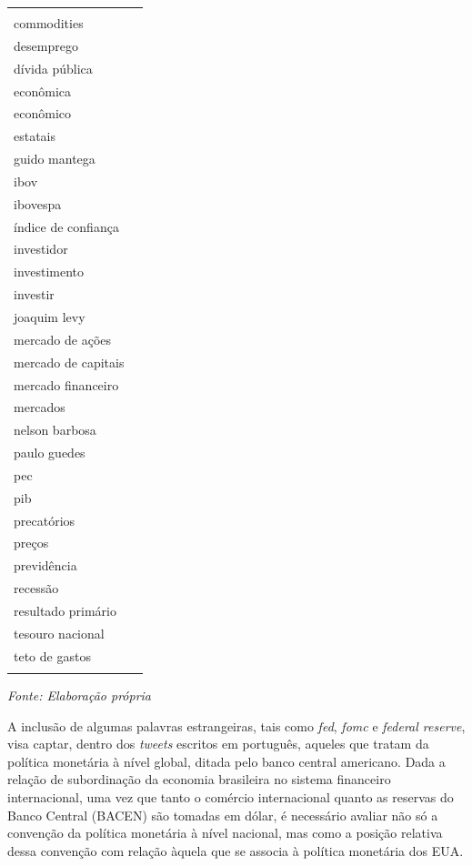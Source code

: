 \begin{minipage}{\textwidth}
\begin{tabularx}{0.7\textwidth}{ %
>{\raggedright\arraybackslash}X
>{\raggedright\arraybackslash}X
}
\begin{tabular}[t]{@{}l@{}}
cambio \\ commodities \\ 
desemprego \\ dívida pública \\ 
econômica \\ econômico \\ 
estatais \\ guido mantega \\ 
ibov \\ ibovespa \\ 
índice de confiança \\ investidor \\ 
investimento \\ investir \\ 
joaquim levy \\ mercado de ações \\ 
mercado de capitais \\ mercado financeiro \\ 
mercados \\ nelson barbosa \\ 
paulo guedes \\ pec \\ 
pib \\ precatórios \\ 
preços \\ previdência \\ 
recessão \\ resultado primário \\ 
tesouro nacional \\ teto de gastos \\ 
\end{tabular} \\ \hline
\end{tabularx}
\vspace{0.2cm}
\par
\begin{minipage}{\textwidth}
        \centering
        \footnotesize %
        \textit{Fonte: Elaboração própria}
    \end{minipage}
\end{minipage}
\bigskip %



A inclusão de algumas palavras estrangeiras, tais como \textit{fed}, \textit{fomc} e \textit{federal reserve}, visa captar, dentro dos \textit{tweets} escritos em português, aqueles que tratam da política monetária à nível global, ditada pelo banco central americano. Dada a relação de subordinação da economia brasileira no sistema financeiro internacional, uma vez que tanto o comércio internacional quanto as reservas do Banco Central (BACEN) são tomadas em dólar, é necessário avaliar não só a convenção da política monetária à nível nacional, mas como a posição relativa dessa convenção com relação àquela que se associa à política monetária dos EUA. 

